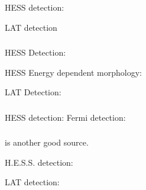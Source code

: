 \subsubsection{\mshfifteenfiftytwo}


HESS detection: \cite{aharonian_2005a_discovery-extended}

LAT detection \cite{abdo_2010a_detection-energetic}

\subsubsection{}


HESS Detection: \cite{aharonian_2006a_h.e.s.s.-survey}

HESS Energy dependent morphology: \cite{aharonian_2006a_energy-dependent}

LAT Detection: \cite{grondin_2011a_detection-pulsar}

\subsubsection{}


HESS detection:  \cite{aharonian_2006a_h.e.s.s.-survey}
Fermi detection: \cite{slane_2010_fermi-detection}

\subsubsection{}

 is another good source.

H.E.S.S. detection: \cite{aharonian_2008a_very-high-energy-gamma-ray}

LAT detection: \cite{rousseau_2012_fermi-lat-constraints}

\subsubsection{}


